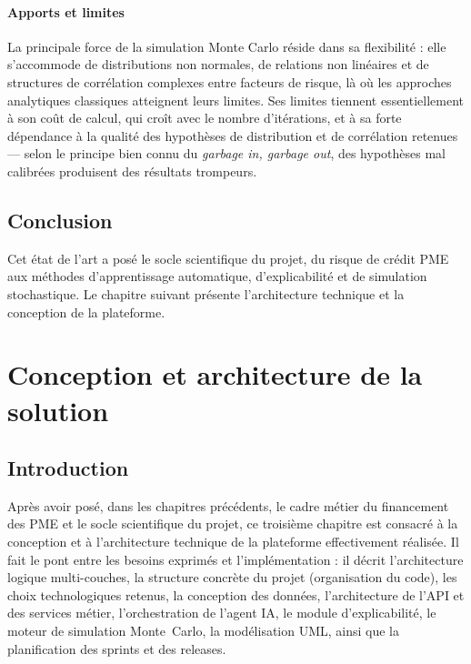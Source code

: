 \documentclass[a4paper,12pt,oneside]{report}
\begin{document}
\subsubsection{Apports et limites}

La principale force de la simulation Monte Carlo réside dans sa flexibilité : elle s'accommode
de distributions non normales, de relations non linéaires et de structures de corrélation
complexes entre facteurs de risque, là où les approches analytiques classiques atteignent
leurs limites. Ses limites tiennent essentiellement à son coût de calcul, qui croît avec le
nombre d'itérations, et à sa forte dépendance à la qualité des hypothèses de distribution et de
corrélation retenues — selon le principe bien connu du \textit{garbage in, garbage out}, des
hypothèses mal calibrées produisent des résultats trompeurs.

\section*{Conclusion}

Cet état de l'art a posé le socle scientifique du projet, du risque de crédit PME aux méthodes
d'apprentissage automatique, d'explicabilité et de simulation stochastique. Le chapitre
suivant présente l'architecture technique et la conception de la plateforme.

\chapter{Conception et architecture de la solution}

\section*{Introduction}

Après avoir posé, dans les chapitres précédents, le cadre métier du financement
des PME et le socle scientifique du projet, ce troisième chapitre est consacré à
la conception et à l'architecture technique de la plateforme effectivement
réalisée. Il fait le pont entre les besoins exprimés et l'implémentation : il décrit
l'architecture logique multi-couches, la structure concrète du projet (organisation
du code), les choix technologiques retenus, la conception des données, l'architecture
de l'API et des services métier, l'orchestration de l'agent IA, le module
d'explicabilité, le moteur de simulation Monte~Carlo, la modélisation UML, ainsi
que la planification des sprints et des releases.
\end{document}
